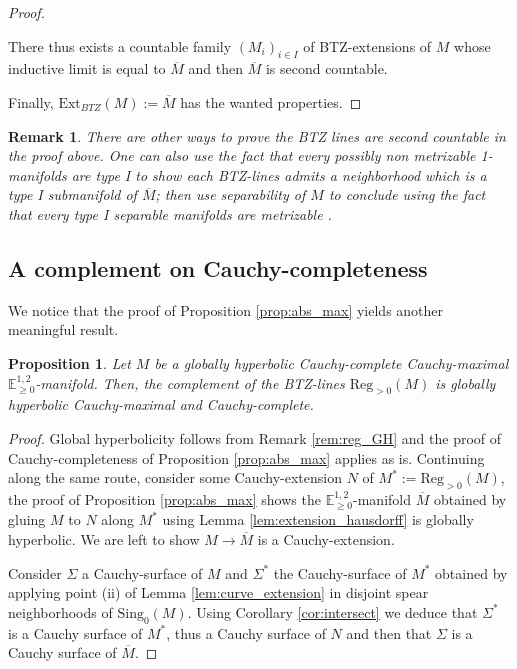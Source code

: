 \documentclass[a4paper,12pt]{article}
\def\sing{\mathrm{Sing}}
\newcommand{\mass}[1]{{\mathbb E}^{1,2}_{#1}}
\def\Reg{\mathrm{Reg}}
\def\BTZext{\mathrm{Ext}_{BTZ}}
\def\reg{\Reg}
\newtheorem{propou}[lemou]{Proposition}
\newtheorem{remark}{Remark}             %
\begin{document}
\begin{proof}
\begin{itemize}
				 There thus exists a countable family $(M_i)_{i\in I}$ of BTZ-extensions  of $M$ whose inductive limit is equal to $\overline M$  and then $\overline M$ is second countable.
				 
			
	
			\end{itemize}

			
			
   Finally, $\BTZext(M) := \overline M $ has the wanted properties.
		\end{proof}
		
\begin{remark}\label{btzrem:other_ways_prove_btz}
 There are other ways to prove the BTZ lines are second countable in the proof above. One can also use the fact that every possibly non metrizable 1-manifolds are type I \cite{MR3244277} to show each BTZ-lines admits a neighborhood which is a type I submanifold of $\overline M$; then use separability of $M$ to conclude using the fact that every type I separable manifolds are metrizable \cite{MR3244277}. 
\end{remark}

\subsection{A complement on Cauchy-completeness}
			\label{sec:complete_stability}
                    
                We notice that the proof of Proposition \ref{prop:abs_max} yields another meaningful result. 
                \begin{propou}\label{btzprop:reg_complete}\label{prop:reg_complete}
                  Let $M$ be a globally hyperbolic Cauchy-complete Cauchy-maximal $\mass{\geq0}$-manifold. 
                  Then, the complement of the BTZ-lines $\reg_{>0}(M)$ is globally hyperbolic Cauchy-maximal and Cauchy-complete. 
                  \end{propou}
                  \begin{proof}
                   Global hyperbolicity follows from Remark \ref{rem:reg_GH} and the proof of Cauchy-complete\-ness of Proposition \ref{prop:abs_max} applies as is. Continuing along the same route, consider some Cauchy-extension $N$ of $M^*:=\reg_{>0}(M)$, the proof of Proposition \ref{prop:abs_max} shows the $\mass{\geq0}$-manifold $\overline M$ obtained by gluing $M$ to $N$ along $M^*$ using Lemma \ref{lem:extension_hausdorff} is globally hyperbolic. We are left to show $M\rightarrow \overline M$ is a Cauchy-extension. 
                
                   
                   Consider $\Sigma$ a Cauchy-surface of $M$ and $\Sigma^*$ the Cauchy-surface of $M^*$ obtained by applying point (ii) of Lemma \ref{lem:curve_extension} in disjoint spear neighborhoods of $\sing_0(M)$.          
                   Using Corollary \ref{cor:intersect} we deduce that $\Sigma^*$ is a Cauchy surface of $M^*$, thus a Cauchy surface of $N$ and then that  $\Sigma$ is a Cauchy surface of $\overline M$.
                  \end{proof}
\end{document}
